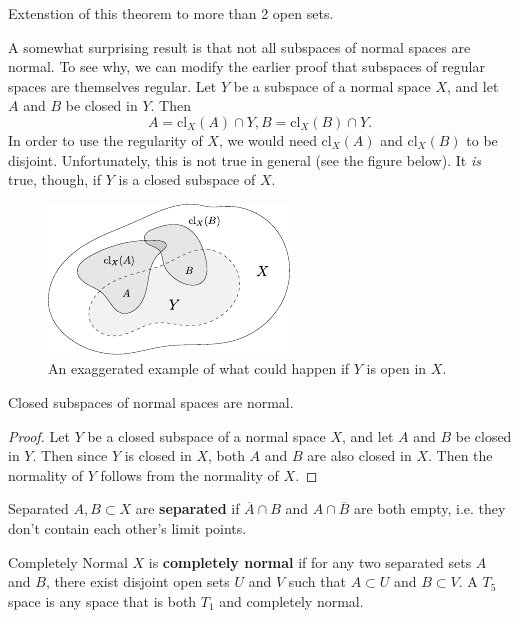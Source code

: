 \documentclass[10pt]{report}
\begin{document}
{\color{red}Extenstion of this theorem to more than 2 open sets.}

A somewhat surprising result is that not all subspaces of normal spaces are normal. To see why, we can modify the earlier proof that subspaces of regular spaces are themselves regular. Let $Y$ be a subspace of a normal space $X$, and let $A$ and $B$ be closed in $Y$. Then
\[
	A= \text{cl}_X(A) \cap Y, B = \text{cl}_X(B) \cap Y.
\] In order to use the regularity of $X$, we would need $\text{cl}_X(A)$ and $\text{cl}_X(B)$ to be disjoint. Unfortunately, this is not true in general (see the figure below). It \textit{is} true, though, if $Y$ is a closed subspace of $X$.

\begin{figure}[H]
	\centering
	\includegraphics[scale=2]{fig/normal-counter.pdf}
	\caption{An exaggerated example of what could happen if $Y$ is open in $X$.}
\end{figure}


\begin{prop}
Closed subspaces of normal spaces are normal.
\end{prop}
\begin{proof}
	Let $Y$ be a closed subspace of a normal space $X$, and let $A$ and $B$ be closed in $Y$. Then since $Y$ is closed in $X$, both $A$ and $B$ are also closed in $X$. Then the normality of $Y$ follows from the normality of $X$.
\end{proof}

\begin{defn}{Separated}{}
$A,B \subset X$ are \textbf{separated} if $\overline{A}\cap B$ and $A \cap \overline{B}$ are both empty, i.e. they don't contain each other's limit points.
\end{defn}

\begin{defn}{Completely Normal}{}
$X$ is \textbf{completely normal} if for any two separated sets $A$ and $B$, there exist disjoint open sets $U$ and $V$ such that $A \subset U$ and $B \subset V$. A $T_5$ space is any space that is both $T_1$ and completely normal.
\end{defn}
\end{document}
